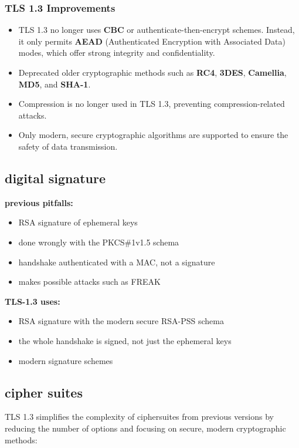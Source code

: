 \subsubsection{TLS 1.3 Improvements}
\begin{itemize}
    \item TLS 1.3 no longer uses \textbf{CBC} or authenticate-then-encrypt schemes. Instead, it only permits \textbf{AEAD} (Authenticated Encryption with Associated Data) modes, which offer strong integrity and confidentiality.
    \item Deprecated older cryptographic methods such as \textbf{RC4}, \textbf{3DES}, \textbf{Camellia}, \textbf{MD5}, and \textbf{SHA-1}.
    \item Compression is no longer used in TLS 1.3, preventing compression-related attacks.
    \item Only modern, secure cryptographic algorithms are supported to ensure the safety of data transmission.
\end{itemize}
\subsection{digital signature}
\textbf{previous pitfalls:}
\begin{itemize}
    \item RSA signature of ephemeral keys
    \item done wrongly with the PKCS\#1v1.5 schema
    \item handshake authenticated with a MAC, not a signature
    \item makes possible attacks such as FREAK
\end{itemize}

\textbf{TLS-1.3 uses:}
\begin{itemize}
    \item RSA signature with the modern secure RSA-PSS schema
    \item the whole handshake is signed, not just the ephemeral keys
    \item modern signature schemes
\end{itemize}

\subsection{cipher suites}

TLS 1.3 simplifies the complexity of ciphersuites from previous versions by reducing the number of options and focusing on secure, modern cryptographic methods:

